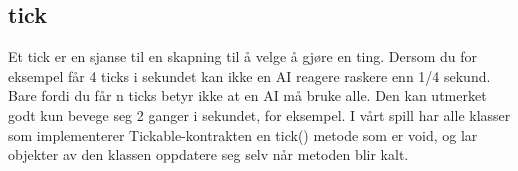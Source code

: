 \documentclass{article}
\begin{document}
\subsection{tick}
\label{subsec:tick}
Et tick er en sjanse til en skapning til å velge å gjøre en ting.
Dersom du for eksempel får 4 ticks i sekundet kan ikke en AI reagere raskere enn 1/4 sekund.
Bare fordi du får n ticks betyr ikke at en AI må bruke alle. Den kan utmerket godt kun bevege seg 2 ganger i sekundet, for eksempel.
I vårt spill har alle klasser som implementerer Tickable-kontrakten en tick() metode som er void, og lar objekter av den klassen oppdatere seg selv når metoden blir kalt.
\end{document}
